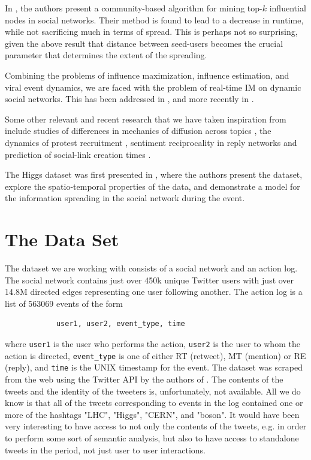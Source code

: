 \documentclass[sigconf]{acmart}
\begin{document}
In \cite{wang2010community}, the authors present a community-based algorithm for mining top-$k$ influential nodes in social networks. Their method is found to lead to a decrease in runtime, while not sacrificing much in terms of spread. This is perhaps not so surprising, given the above result that distance between seed-users becomes the crucial parameter that determines the extent of the spreading. 

Combining the problems of influence maximization, influence estimation, and viral event dynamics, we are faced with the problem of real-time IM on dynamic social networks. This has been addressed in \cite{rodriguez2012influence}, and more recently in \cite{wang2017real}.

Some other relevant and recent research that we have taken inspiration from include studies of differences in mechanics of diffusion across topics \cite{romero2011differences}, the dynamics of protest recruitment \cite{gonzalez2011dynamics}, sentiment reciprocality in reply networks \cite{bliss2012twitter} and prediction of social-link creation times \cite{meeder2011we}.

The Higgs dataset was first presented in \cite{de2013anatomy}, where the authors present the dataset, explore the spatio-temporal properties of the data, and demonstrate a model for the information spreading in the social network during the event.

\section{The Data Set}

The dataset we are working with consists of a social network and an action log. The social network contains just over 450k unique Twitter users with just over 14.8M directed edges representing one user following another. The action log is a list of 563069 events of the form 

\begin{center}
\begin{verbatim}
            user1, user2, event_type, time
\end{verbatim}
\end{center}

where \verb+user1+ is the user who performs the action, \verb+user2+ is the user to whom the action is directed, \verb+event_type+ is one of either RT (retweet), MT (mention) or RE (reply), and \verb+time+ is the UNIX timestamp for the event. The dataset was scraped from the web using the Twitter API by the authors of \cite{de2013anatomy}. The contents of the tweets and the identity of the tweeters is, unfortunately, not available. All we do know is that all of the tweets corresponding to events in the log contained one or more of the hashtags "LHC", "Higgs", "CERN", and "boson". It would have been very interesting to have access to not only the contents of the tweets, e.g. in order to perform some sort of semantic analysis, but also to have access to standalone tweets in the period, not just user to user interactions. 
\end{document}
